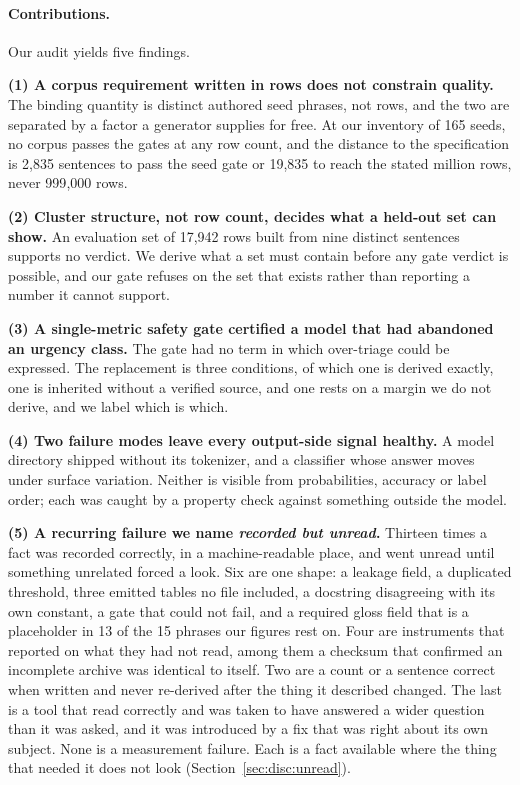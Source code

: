 \paragraph{Contributions.} Our audit yields five findings.

\textbf{(1) A corpus requirement written in rows does not constrain quality.}
The binding quantity is distinct authored seed phrases, not rows, and the two
are separated by a factor a generator supplies for free. At our inventory of
165 seeds, no corpus passes the gates at any row count, and the distance to the
specification is 2{,}835 sentences to pass the seed gate or 19{,}835 to reach
the stated million rows, never 999{,}000 rows.

\textbf{(2) Cluster structure, not row count, decides what a held-out set can
show.} An evaluation set of 17{,}942 rows built from nine distinct sentences
supports no verdict. We derive what a set must contain before any gate verdict
is possible, and our gate refuses on the set that exists rather than reporting a
number it cannot support.

\textbf{(3) A single-metric safety gate certified a model that had abandoned an
urgency class.} The gate had no term in which over-triage could be expressed.
The replacement is three conditions, of which one is derived exactly, one is
inherited without a verified source, and one rests on a margin we do not derive,
and we label which is which.

\textbf{(4) Two failure modes leave every output-side signal healthy.} A model
directory shipped without its tokenizer, and a classifier whose answer moves
under surface variation. Neither is visible from probabilities, accuracy or
label order; each was caught by a property check against something outside the
model.

\textbf{(5) A recurring failure we name \emph{recorded but unread}.} Thirteen
times a fact was recorded correctly, in a machine-readable place, and went unread
until something unrelated forced a look. Six are one shape: a leakage field, a
duplicated threshold, three emitted tables no file included, a docstring
disagreeing with its own constant, a gate that could not fail, and a required
gloss field that is a placeholder in 13 of the 15 phrases our figures rest on.
Four are instruments that reported on what they had not read, among them a
checksum that confirmed an incomplete archive was identical to itself. Two are a
count or a sentence correct when written and never re-derived after the thing it
described changed. The last is a tool that read correctly and was taken to have
answered a wider question than it was asked, and it was introduced by a fix that
was right about its own subject. None is a measurement failure. Each is a fact
available where the thing that needed it does not look
(Section~\ref{sec:disc:unread}).

